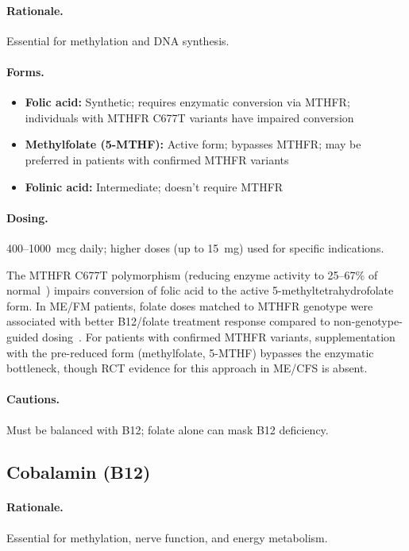 \paragraph{Rationale.} Essential for methylation and DNA synthesis.

\paragraph{Forms.}
\begin{itemize}
    \item \textbf{Folic acid:} Synthetic; requires enzymatic conversion via MTHFR; individuals with MTHFR C677T variants have impaired conversion~\cite{Zarembska2023}
    \item \textbf{Methylfolate (5-MTHF):} Active form; bypasses MTHFR; may be preferred in patients with confirmed MTHFR variants
    \item \textbf{Folinic acid:} Intermediate; doesn't require MTHFR
\end{itemize}

\paragraph{Dosing.} 400--1000~mcg daily; higher doses (up to 15~mg) used for specific indications.

The MTHFR C677T polymorphism (reducing enzyme activity to 25--67\% of normal~\cite{Zarembska2023})
impairs conversion of folic acid to the active 5-methyltetrahydrofolate form. In ME/FM patients,
folate doses matched to MTHFR genotype were associated with better B12/folate treatment response
compared to non-genotype-guided dosing~\cite{Regland2015}. For patients with confirmed MTHFR
variants, supplementation with the pre-reduced form (methylfolate, 5-MTHF) bypasses the
enzymatic bottleneck, though RCT evidence for this approach in ME/CFS is absent.

\paragraph{Cautions.} Must be balanced with B12; folate alone can mask B12 deficiency.

\subsection{Cobalamin (B12)}

\paragraph{Rationale.} Essential for methylation, nerve function, and energy metabolism.

